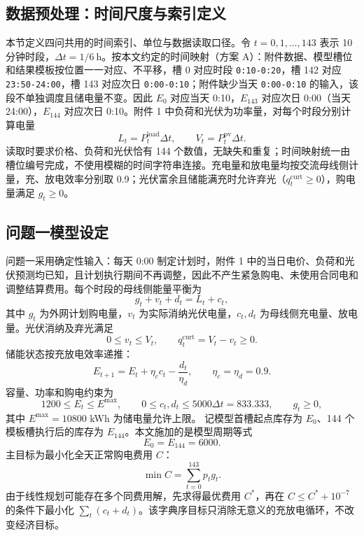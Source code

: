 \documentclass[withoutpreface,bwprint]{cumcmthesis}
\begin{document}
\subsection{数据预处理：时间尺度与索引定义}

本节定义四问共用的时间索引、单位与数据读取口径。令 $t=0,1,\ldots,143$ 表示 10 分钟时段，$\Delta t=1/6\ \mathrm{h}$。按本文约定的时间映射（方案 A）：附件数据、模型槽位和结果模板按位置一一对应、不平移，槽 0 对应时段 \texttt{0:10-0:20}，槽 142 对应 \texttt{23:50-24:00}，槽 143 对应次日 \texttt{0:00-0:10}；附件缺少当天 \texttt{0:00-0:10} 的输入，该段不单独调度且储电量不变。因此 $E_0$ 对应当天 0:10，$E_{143}$ 对应次日 0:00（当天 24:00），$E_{144}$ 对应次日 0:10。附件 1 中负荷和光伏为功率量，对每个时段分别计算电量
\begin{equation}
L_t=P_t^{\mathrm{load}}\Delta t,\qquad
V_t=P_t^{\mathrm{pv}}\Delta t. \label{eq:q1_energy}
\end{equation}
读取时要求价格、负荷和光伏恰有 144 个数值，无缺失和重复；时间映射统一由槽位编号完成，不使用模糊的时间字符串连接。充电量和放电量均按交流母线侧计量，充、放电效率分别取 0.9；光伏富余且储能满充时允许弃光（$q_t^{\mathrm{curt}}\ge0$），购电量满足 $g_t\ge0$。

\subsection{问题一模型设定}

问题一采用确定性输入：每天 0:00 制定计划时，附件 1 中的当日电价、负荷和光伏预测均已知，且计划执行期间不再调整，因此不产生紧急购电、未使用合同电和调整结算费用。每个时段的母线侧能量平衡为
\begin{equation}
g_t+v_t+d_t=L_t+c_t, \label{eq:q1_balance}
\end{equation}
其中 $g_t$ 为外网计划购电量，$v_t$ 为实际消纳光伏电量，$c_t,d_t$ 为母线侧充电量、放电量。光伏消纳及弃光满足
\begin{equation}
0\le v_t\le V_t,\qquad q_t^{\mathrm{curt}}=V_t-v_t\ge0. \label{eq:q1_pv}
\end{equation}
储能状态按充放电效率递推：
\begin{equation}
E_{t+1}=E_t+\eta_c c_t-\frac{d_t}{\eta_d},\qquad
\eta_c=\eta_d=0.9. \label{eq:q1_soc}
\end{equation}
容量、功率和购电约束为
\begin{equation}
1200\le E_t\le E^{\max},\qquad
0\le c_t,d_t\le5000\Delta t=833.333,\qquad
g_t\ge0, \label{eq:q1_bounds}
\end{equation}
其中 $E^{\max}=10800$ kWh 为储电量允许上限。
记模型首槽起点库存为 $E_0$、144 个模板槽执行后的库存为 $E_{144}$。本文施加的是模型周期等式
\begin{equation}
E_0=E_{144}=6000. \label{eq:q1_terminal}
\end{equation}
主目标为最小化全天正常购电费用 $C$：
\begin{equation}
\min C=\sum_{t=0}^{143}p_tg_t. \label{eq:q1_obj}
\end{equation}
由于线性规划可能存在多个同费用解，先求得最优费用 $C^*$，再在 $C\le C^*+10^{-7}$ 的条件下最小化 $\sum_t(c_t+d_t)$。该字典序目标只消除无意义的充放电循环，不改变经济目标。
\end{document}
